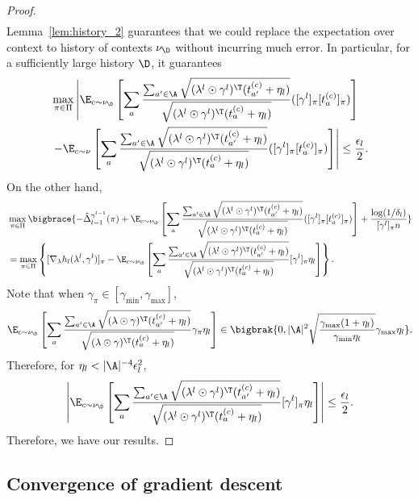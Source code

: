 \documentclass{article}
\newcommand{\1}{\mathbf{1}}
\begin{document}
\begin{proof}
\begin{align*}
\end{align*}
Lemma~\ref{lem:history_2} guarantees that we could replace the expectation over context to history of contexts $\nu_\D$ without incurring much error. In particular, for a sufficiently large history $\D$, it guarantees 
\begin{align*}
    &\max_{\pi\in\Pi}\left|\E_{c\sim\nu_\D}\left[\sum_{a}\frac{\sum_{a'\in\A}\sqrt{(\lambda^{l}\odot\gamma^l)^\T (t_{a'}^{(c)}+\eta_l)}}{\sqrt{(\lambda^{l}\odot\gamma^l)^\T (t_{a}^{(c)}+\eta_l)}}([\gamma^l]_\pi[t_a^{(c)}]_\pi)\right]\right.\\
    &\left.-\E_{c\sim\nu}\left[\sum_{a}\frac{\sum_{a'\in\A}\sqrt{(\lambda^{l}\odot\gamma^l)^\T (t_{a'}^{(c)}+\eta_l)}}{\sqrt{(\lambda^{l}\odot\gamma^l)^\T (t_{a}^{(c)}+\eta_l)}}([\gamma^l]_\pi[t_a^{(c)}]_\pi)\right]\right|\leq \frac{\epsilon_l}{2}.
\end{align*}
On the other hand, 
\begin{align*}
    &\max_{\pi\in\Pi}\bigbrace{-\hat{\Delta}_{l-1}^{\gamma^{l-1}}(\pi)+\E_{c\sim\nu_\D}\left[\sum_{a}\frac{\sum_{a'\in\A}\sqrt{(\lambda^{l}\odot\gamma^l)^\T (t_{a'}^{(c)}+\eta_l)}}{\sqrt{(\lambda^{l}\odot\gamma^l)^\T (t_{a}^{(c)}+\eta_l)}}([\gamma^l]_\pi[t_a^{(c)}]_\pi)\right]+\frac{\log(1/\delta_l)}{[\gamma^l]_\pi n}}\\
    &= \max_{\pi\in\Pi}\left\{[\nabla_{\lambda}h_l(\lambda^{l},\gamma^l)]_\pi-\E_{c\sim\nu_\D}\left[\sum_{a}\frac{\sum_{a'\in\A}\sqrt{(\lambda^{l}\odot\gamma^l)^\T (t_{a'}^{(c)}+\eta_l)}}{\sqrt{(\lambda^{l}\odot\gamma^l)^\T (t_{a}^{(c)}+\eta_l)}}[\gamma^l]_\pi\eta_l\right]\right\}.
\end{align*}
Note that when $\gamma_\pi\in[\gamma_{\min},\gamma_{\max}]$,
\begin{align*}
    \E_{c\sim\nu_\D}\left[\sum_{a}\frac{\sum_{a'\in\A}\sqrt{(\lambda\odot\gamma)^\T (t_{a'}^{(c)}+\eta_l)}}{\sqrt{(\lambda\odot\gamma)^\T (t_{a}^{(c)}+\eta_l)}}\gamma_\pi\eta_l\right]\in \bigbrak{0,|\A|^2\sqrt{\frac{\gamma_{\max}(1+\eta_l)}{\gamma_{\min}\eta_l}}\gamma_{\max}\eta_l}. 
\end{align*}
Therefore, for $\eta_l<|\A|^{-4}\epsilon_l^{2}$, 
\[\left|\E_{c\sim\nu_\D}\left[\sum_{a}\frac{\sum_{a'\in\A}\sqrt{(\lambda^{l}\odot\gamma^l)^\T (t_{a'}^{(c)}+\eta_l)}}{\sqrt{(\lambda^{l}\odot\gamma^l)^\T (t_{a}^{(c)}+\eta_l)}}[\gamma^l]_\pi\eta_l\right]\right|\leq\frac{\epsilon_l}{2}.\]
Therefore, we have our results. 
\end{proof}

\subsection{Convergence of gradient descent}\label{sec:conv_gd}
\end{document}
